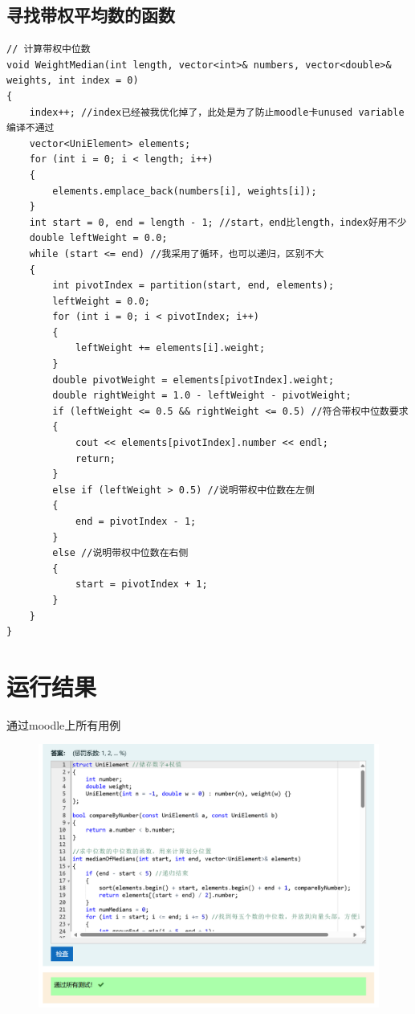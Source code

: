 \documentclass[UTF8]{ctexart}
\begin{document}
\subsection{寻找带权平均数的函数}
\begin{lstlisting}
// 计算带权中位数
void WeightMedian(int length, vector<int>& numbers, vector<double>& weights, int index = 0) 
{
    index++; //index已经被我优化掉了，此处是为了防止moodle卡unused variable编译不通过
    vector<UniElement> elements;
    for (int i = 0; i < length; i++) 
    {
        elements.emplace_back(numbers[i], weights[i]);
    }
    int start = 0, end = length - 1; //start，end比length，index好用不少
    double leftWeight = 0.0;
    while (start <= end) //我采用了循环，也可以递归，区别不大
    {
        int pivotIndex = partition(start, end, elements);
        leftWeight = 0.0;
        for (int i = 0; i < pivotIndex; i++)
        {
            leftWeight += elements[i].weight;
        }
        double pivotWeight = elements[pivotIndex].weight;
        double rightWeight = 1.0 - leftWeight - pivotWeight;
        if (leftWeight <= 0.5 && rightWeight <= 0.5) //符合带权中位数要求
        {
            cout << elements[pivotIndex].number << endl;
            return;
        } 
        else if (leftWeight > 0.5) //说明带权中位数在左侧
        {
            end = pivotIndex - 1;
        } 
        else //说明带权中位数在右侧
        { 
            start = pivotIndex + 1;
        }
    }
}
\end{lstlisting}

\section{运行结果}
通过moodle上所有用例
\begin{figure}[htbp]
    \centering
    \includegraphics[width=1\textwidth]{moodle1.png}
\end{figure}
\end{document}

